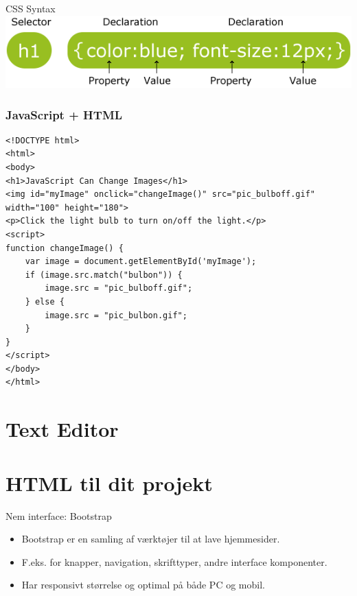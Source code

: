 \documentclass[10pt]{beamer}
\begin{document}
\begin{frame}{CSS Syntax}
		\includegraphics[width=\linewidth]{img/css-syntax.png}
\end{frame}

\begin{frame}[fragile]
 \frametitle{JavaScript + HTML}
\begin{lstlisting}
<!DOCTYPE html>
<html>
<body>
<h1>JavaScript Can Change Images</h1>
<img id="myImage" onclick="changeImage()" src="pic_bulboff.gif" width="100" height="180">
<p>Click the light bulb to turn on/off the light.</p>
<script>
function changeImage() {
    var image = document.getElementById('myImage');
    if (image.src.match("bulbon")) {
        image.src = "pic_bulboff.gif";
    } else {
        image.src = "pic_bulbon.gif";
    }
}
</script>
</body>
</html>
\end{lstlisting}
\end{frame}

\section{Text Editor}

\section{HTML til dit projekt}

\begin{frame}{Nem interface: Bootstrap}
	\begin{itemize}
		\item Bootstrap er en samling af værktøjer til at lave hjemmesider.
		\pause
		\item F.eks. for knapper, navigation, skrifttyper, andre interface komponenter.
		\pause
		\item Har responsivt størrelse og optimal på både PC og mobil.
	\end{itemize}
\end{frame}
\end{document}

